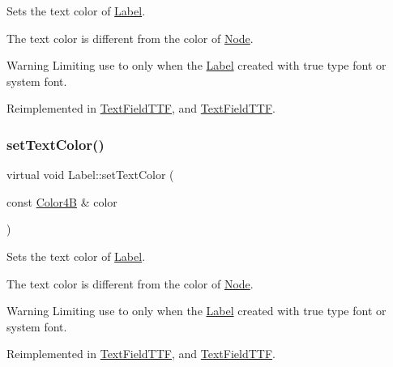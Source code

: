 Sets the text color of \hyperlink{classLabel}{Label}.

The text color is different from the color of \hyperlink{classNode}{Node}.

\begin{DoxyWarning}{Warning}
Limiting use to only when the \hyperlink{classLabel}{Label} created with true type font or system font. 
\end{DoxyWarning}


Reimplemented in \hyperlink{classTextFieldTTF_a922f50aac8989d42977d1db5fe63da95}{Text\+Field\+T\+TF}, and \hyperlink{classTextFieldTTF_a3ddb9d26ec68e2b25bcdda2a1628f267}{Text\+Field\+T\+TF}.

\mbox{\label{classLabel_a80fd59b2bd8674240bb1c2dac7144ee0}} 
\subsubsection{\texorpdfstring{set\+Text\+Color()}{setTextColor()}\hspace{0.1cm}{\footnotesize\ttfamily [2/2]}}
{\footnotesize\ttfamily virtual void Label\+::set\+Text\+Color (\begin{DoxyParamCaption}\item[{const \hyperlink{structColor4B}{Color4B} \&}]{color }\end{DoxyParamCaption})\hspace{0.3cm}{\ttfamily [virtual]}}

Sets the text color of \hyperlink{classLabel}{Label}.

The text color is different from the color of \hyperlink{classNode}{Node}.

\begin{DoxyWarning}{Warning}
Limiting use to only when the \hyperlink{classLabel}{Label} created with true type font or system font. 
\end{DoxyWarning}


Reimplemented in \hyperlink{classTextFieldTTF_a922f50aac8989d42977d1db5fe63da95}{Text\+Field\+T\+TF}, and \hyperlink{classTextFieldTTF_a3ddb9d26ec68e2b25bcdda2a1628f267}{Text\+Field\+T\+TF}.

\mbox{\label{classLabel_abb4d7ab50a3419e9a17f18074bf3c581}} 
